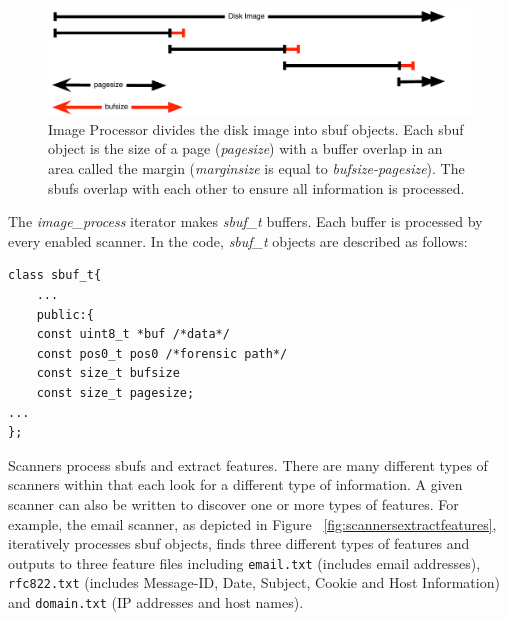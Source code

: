 \documentclass[11pt,fleqn]{article} %
\begin{document}
\begin{figure}
	\includegraphics[scale=0.60]{margindepiction.pdf}
	\caption{Image Processor divides the disk image into sbuf objects. Each sbuf object is the size of a page (\textit{pagesize}) with a buffer overlap in an area called the margin (\textit{marginsize} is equal to \textit{bufsize-pagesize}). The sbufs overlap with each other to ensure all information is processed.}
	\label{fig:margindepiction}
\end{figure}


The \textit{image\_process} iterator makes \textit{sbuf\_t} buffers. Each buffer is processed by every enabled scanner. In the \bulk code, \textit{sbuf\_t} objects are described as follows:
\lstset{basicstyle=\footnotesize}

\lstset{style=codelisting}
\begin{lstlisting}
class sbuf_t{
	...
	public:{
	const uint8_t *buf /*data*/
	const pos0_t pos0 /*forensic path*/
	const size_t bufsize
	const size_t pagesize;
...
};
\end{lstlisting}


Scanners process sbufs and extract features.  There are many different types of scanners within \bulk that each look for a different type of information. A given scanner can also be written to discover one or more types of features. For example, the email scanner, as depicted in Figure ~\ref{fig:scannersextractfeatures}, iteratively processes sbuf objects, finds three different types of features and outputs to three feature files including \texttt{email.txt} (includes email addresses), \texttt{rfc822.txt} (includes Message-ID, Date, Subject, Cookie and Host Information) and \texttt{domain.txt} (IP addresses and host names). \\
\end{document}
